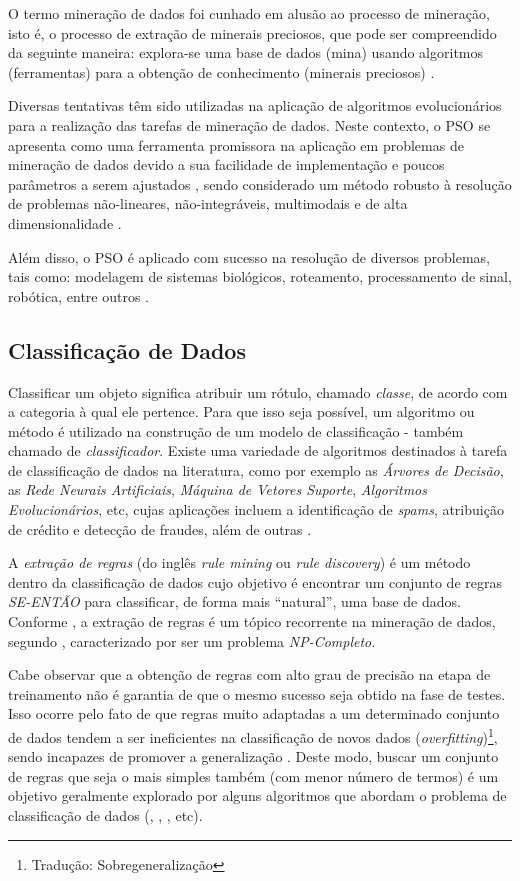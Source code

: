 \documentclass[
	12pt,				%
	openany,			%
	oneside,	
	a4paper,			%
	brazil,				%
	]{unimontes-ppgmsc-abntex2}
\begin{document}
O termo mineração de dados foi cunhado em alusão ao processo de mineração, isto é, o processo de extração de minerais preciosos, que pode ser compreendido da seguinte maneira: explora-se uma base de dados (mina) usando algoritmos (ferramentas) para a obtenção de conhecimento (minerais preciosos) \cite{Castro_2016}. 

Diversas tentativas têm sido utilizadas na aplicação de algoritmos evolucionários para a realização das tarefas de mineração de dados. Neste contexto, o PSO se apresenta como uma ferramenta promissora na aplicação em problemas de mineração de dados devido a sua facilidade de implementação e poucos parâmetros a serem ajustados \cite{Wang_2007}, sendo considerado um método robusto à resolução de problemas não-lineares, não-integráveis, multimodais e de alta dimensionalidade \cite{Krohling_2004}. 

Além disso, o PSO é aplicado com sucesso na resolução de diversos problemas, tais como: modelagem de sistemas biológicos, roteamento, processamento de sinal, robótica, entre outros \cite{Eberhart_2001}. 


\subsection{Classificação de Dados}
\label{sec:classif_dados}

Classificar um objeto significa atribuir um rótulo, chamado {\em classe}, de acordo com a categoria à qual ele pertence. Para que isso seja possível, um algoritmo ou método é utilizado na construção de um modelo de classificação - também chamado de {\em classificador}. Existe uma variedade de algoritmos destinados à tarefa de classificação de dados na literatura, como por exemplo as {\em Árvores de Decisão}, as {\em Rede Neurais Artificiais}, {\em Máquina de Vetores Suporte}, {\em Algoritmos Evolucionários}, etc, cujas aplicações incluem a identificação de {\em spams}, atribuição de crédito e detecção de fraudes, além de outras \cite{Castro_2016}.

A {\em extração de regras} (do inglês {\em rule mining} ou {\em rule discovery}) é um método dentro da classificação de dados cujo objetivo é encontrar um conjunto de regras {\em SE-ENTÃO} para classificar, de forma mais ``natural'',  uma base de dados. Conforme , a extração de regras é um tópico recorrente na mineração de dados, segundo , caracterizado por ser um problema {\em NP-Completo}.

Cabe observar que a obtenção de regras com alto grau de precisão na etapa de treinamento não é garantia de que o mesmo sucesso seja obtido na fase de testes. Isso ocorre pelo fato de que regras muito adaptadas a um determinado conjunto de dados tendem a ser ineficientes na classificação de novos dados ({\em overfitting})\footnote{Tradução: Sobregeneralização}, sendo incapazes de promover a generalização \cite{Pereira_2010}. Deste modo, buscar um conjunto de regras que seja o mais simples também (com menor número de termos) é um objetivo geralmente explorado por alguns algoritmos que abordam o problema de classificação de dados (, , , etc).
\end{document}
